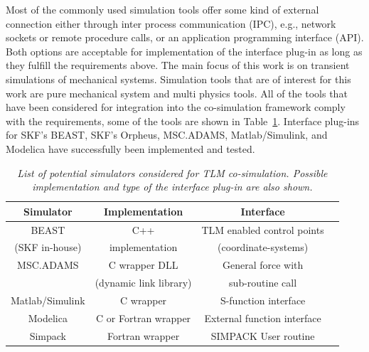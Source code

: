
\noindent Most of the commonly used simulation tools offer some kind of external connection either through inter process communication (IPC), e.g., network sockets or remote procedure calls, or an application programming interface (API). 
Both options are acceptable for implementation of the interface plug-in as long as they fulfill the requirements above. 
The main focus of this work is on transient simulations of mechanical systems. 
Simulation tools that are of interest for this work are pure mechanical system and multi physics tools. 
All of the tools that have been considered for integration into the co-simulation framework comply with the requirements, some of the tools are shown in Table~\ref{tab:SimTools}. 
Interface plug-ins for SKF's BEAST, SKF's Orpheus, MSC.ADAMS, Matlab/Simulink, and Modelica have successfully been implemented and tested.

\begin{table}
\begin{center}
\caption{\em List of potential simulators considered for TLM co-simulation. 
Possible implementation and type of the interface plug-in are also shown. }
\vspace*{1mm}
\begin{tabular}{||c|c|c|c||}

\hline
Simulator & Implementation  & Interface \\
\hline
\hline
BEAST   & C++     &  TLM enabled control points \\
(SKF in-house)	& implementation & (coordinate-systems)\\
\hline
MSC.ADAMS  & C wrapper DLL	    &  General force with \\
	   & (dynamic link library) &  sub-routine call  \\
\hline
Matlab/Simulink  & C wrapper & S-function interface \\
\hline
Modelica  & C or Fortran wrapper & External function interface\\
\hline
Simpack  & Fortran wrapper & SIMPACK User routine  \\
\hline

\end{tabular}
\label{tab:SimTools}
\end{center}
\end{table}

